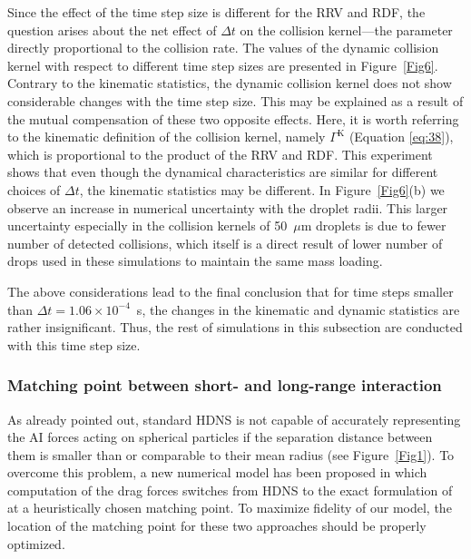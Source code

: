 \documentclass[../thesis.tex]{subfiles}
\begin{document}
Since the effect of the time step size is different for the RRV and RDF, the question arises about the net effect of $\Delta t$ on the collision kernel---the parameter directly proportional to the collision rate. The values of the dynamic collision kernel with respect to different time step sizes are presented in Figure~\ref{Fig6}. Contrary to the kinematic statistics, the dynamic collision kernel does not show considerable changes with the time step size. This may be explained as a result of the mutual compensation of these two opposite effects. Here, it is worth referring to the kinematic definition of the collision kernel, namely $\Gamma^\text{K}$ (Equation \ref{eq:38}), which is proportional to the product of the RRV and RDF. This experiment shows that even though the dynamical characteristics are similar for different choices of $\Delta t$, the kinematic statistics may be different. In Figure~\ref{Fig6}(b) we observe an increase in numerical uncertainty with the droplet radii. This larger uncertainty especially in the collision kernels of 50~$\mu$m droplets is due to fewer number of detected collisions, which itself is a direct result of lower number of drops used in these simulations to maintain the same mass loading.

The above considerations lead to the final conclusion that for time steps smaller than $\Delta t=1.06\times10^{-4}$~s, the changes in the kinematic and dynamic statistics are rather insignificant. Thus, the rest of simulations in this subsection are conducted with this time step size.



\subsubsection{Matching point between short- and long-range interaction}
As already pointed out, standard HDNS is not capable of accurately representing the AI forces acting on spherical particles if the separation distance between them is smaller than or comparable to their mean radius (see Figure~\ref{Fig1}). To overcome this problem, a new numerical model has been proposed in which computation of the drag forces switches from HDNS to the exact formulation of \citet{JO84} at a heuristically chosen matching point. To maximize fidelity of our model, the location of the matching point for these two approaches should be properly optimized.
\end{document}
